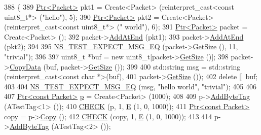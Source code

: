 \begin{DoxyCode}
388 \{
389   \hyperlink{classns3_1_1Ptr}{Ptr<Packet>} pkt1 = Create<Packet> (\textcolor{keyword}{reinterpret\_cast<}\textcolor{keyword}{const }uint8\_t*\textcolor{keyword}{>} (\textcolor{stringliteral}{"hello"}), 5);
390   \hyperlink{classns3_1_1Ptr}{Ptr<Packet>} pkt2 = Create<Packet> (\textcolor{keyword}{reinterpret\_cast<}\textcolor{keyword}{const }uint8\_t*\textcolor{keyword}{>} (\textcolor{stringliteral}{" world"}), 6);
391   \hyperlink{classns3_1_1Ptr}{Ptr<Packet>} packet = Create<Packet> ();
392   packet->\hyperlink{classns3_1_1Packet_a14ec3d4250b425468764de58f5837b6b}{AddAtEnd} (pkt1);
393   packet->\hyperlink{classns3_1_1Packet_a14ec3d4250b425468764de58f5837b6b}{AddAtEnd} (pkt2);
394 
395   \hyperlink{group__testing_ga7304ba46a28d8cf08dfdfd6499cf7068}{NS\_TEST\_EXPECT\_MSG\_EQ} (packet->\hyperlink{classns3_1_1Packet_a462855c9929954d4301a4edfe55f4f1c}{GetSize} (), 11, \textcolor{stringliteral}{"trivial"});
396 
397   uint8\_t *buf = \textcolor{keyword}{new} uint8\_t[packet->\hyperlink{classns3_1_1Packet_a462855c9929954d4301a4edfe55f4f1c}{GetSize} ()];
398   packet->\hyperlink{classns3_1_1Packet_a5a6d304b9e0d90733919ffe224b98f0d}{CopyData} (buf, packet->\hyperlink{classns3_1_1Packet_a462855c9929954d4301a4edfe55f4f1c}{GetSize} ());
399 
400   std::string msg = std::string (reinterpret\_cast<const char *>(buf),
401                                  packet->\hyperlink{classns3_1_1Packet_a462855c9929954d4301a4edfe55f4f1c}{GetSize} ());
402   \textcolor{keyword}{delete} [] buf;
403 
404   \hyperlink{group__testing_ga7304ba46a28d8cf08dfdfd6499cf7068}{NS\_TEST\_EXPECT\_MSG\_EQ} (msg, \textcolor{stringliteral}{"hello world"}, \textcolor{stringliteral}{"trivial"});
405 
406 
407   \hyperlink{classns3_1_1Ptr}{Ptr<const Packet>} \hyperlink{lte__link__budget_8m_ac9de518908a968428863f829398a4e62}{p} = Create<Packet> (1000);
408 
409   p->\hyperlink{classns3_1_1Packet_ad5997caea8c22757acade2fcb4d7daca}{AddByteTag} (ATestTag<1> ());
410   \hyperlink{packet-test-suite_8cc_a11af326b9297affa78c47b78c80f8a44}{CHECK} (p, 1, \hyperlink{packet-test-suite_8cc_a171669980e29849aa5e3722d573181ee}{E} (1, 0, 1000));
411   \hyperlink{classns3_1_1Ptr}{Ptr<const Packet>} copy = p->\hyperlink{classns3_1_1Packet_a5d5c70802a5f77fc5f0001e0cfc1898b}{Copy} ();
412   \hyperlink{packet-test-suite_8cc_a11af326b9297affa78c47b78c80f8a44}{CHECK} (copy, 1, \hyperlink{packet-test-suite_8cc_a171669980e29849aa5e3722d573181ee}{E} (1, 0, 1000));
413 
414   p->\hyperlink{classns3_1_1Packet_ad5997caea8c22757acade2fcb4d7daca}{AddByteTag} (ATestTag<2> ());

\end{DoxyCode}
